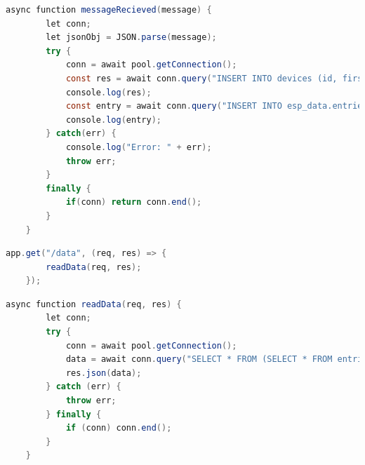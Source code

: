 \begin{lstlisting}[language=java, caption={Funktion: messageRecieved}, label=lst:function_message_recieved]
	async function messageRecieved(message) {
		let conn;
		let jsonObj = JSON.parse(message);
		try {
			conn = await pool.getConnection();
			const res = await conn.query("INSERT INTO devices (id, first_entry, last_entry) VALUES (?, ?, ?) ON DUPLICATE KEY UPDATE last_entry = VALUES (last_entry);", [jsonObj.device_id, jsonObj.timestamp, jsonObj.timestamp]);
			console.log(res);
			const entry = await conn.query("INSERT INTO esp_data.entries (esp_id, altitude, pressure, temperature, humidity, recorded_at) VALUES (?, ?, ?, ?, ?, ?);", [jsonObj.device_id, jsonObj.altitude, jsonObj.airPressure, jsonObj.temperature, jsonObj.humidity, jsonObj.timestamp]);
			console.log(entry);
		} catch(err) {
			console.log("Error: " + err);
			throw err;
		}
		finally {
			if(conn) return conn.end();
		}
	}
\end{lstlisting}

\begin{lstlisting}[language=java, caption={Route: getData}, label=lst:route_get_data]
	app.get("/data", (req, res) => {
		readData(req, res);
	});
\end{lstlisting}

\begin{lstlisting}[language=java, caption={Funktion: readData}, label=lst:function_read_data]
	async function readData(req, res) {
		let conn;
		try {
			conn = await pool.getConnection();
			data = await conn.query("SELECT * FROM (SELECT * FROM entries ORDER BY recorded_at DESC LIMIT 1000) AS subquery ORDER BY id ASC;");
			res.json(data);
		} catch (err) {
			throw err;
		} finally {
			if (conn) conn.end();
		}
	}
\end{lstlisting}